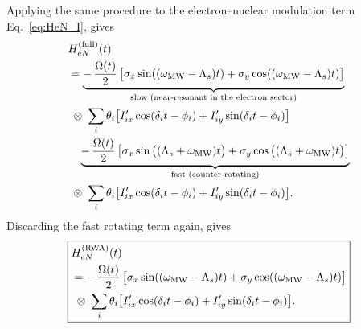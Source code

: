 Applying the same procedure to the electron–nuclear modulation term Eq.~\eqref{eq:HeN_I}, gives
\begin{align}
&\notag H_{eN}^{(\mathrm{full})}(t)\\
&\notag=
\underbrace{-\,\frac{\Omega(t)}{2}\,
\big[\sigma_x\sin((\omega_{\mathrm{MW}}-\Lambda_s) t)+\sigma_y\cos((\omega_{\mathrm{MW}}-\Lambda_s) t)\big]}_{\text{slow (near-resonant in the electron sector)}}\;\\
&\notag\;\otimes\;
\sum_i \theta_i\big[I'_{ix}\cos(\delta_i t-\phi_i)+I'_{iy}\sin(\delta_i t-\phi_i)\big]\\
&\notag\hspace{-0.0cm}\quad
\underbrace{-\,\frac{\Omega(t)}{2}\,
\big[\sigma_x\sin\big((\Lambda_s+\omega_{\mathrm{MW}})t\big)
      +\sigma_y\cos\big((\Lambda_s+\omega_{\mathrm{MW}})t\big)\big]}_{\text{fast (counter-rotating)}}\\
&\;\otimes\;
\sum_i \theta_i\big[I'_{ix}\cos(\delta_i t-\phi_i)+I'_{iy}\sin(\delta_i t-\phi_i)\big].
\label{eq:HeN_full_split}
\end{align}
Discarding the fast rotating term again, gives 
\begin{equation}
\boxed{
\begin{aligned}
&H_{eN}^{(\mathrm{RWA})}(t)\\
&\notag=-\,\frac{\Omega(t)}{2}\,
\big[\sigma_x\sin((\omega_{\mathrm{MW}}-\Lambda_s) t)+\sigma_y\cos((\omega_{\mathrm{MW}}-\Lambda_s) t)\big]\\
&\;\otimes\;
\sum_i \theta_i\big[I'_{ix}\cos(\delta_i t-\phi_i)+I'_{iy}\sin(\delta_i t-\phi_i)\big].
\end{aligned}
}
\label{eq:HeN_RWA_time_nophase_final}
\end{equation}

